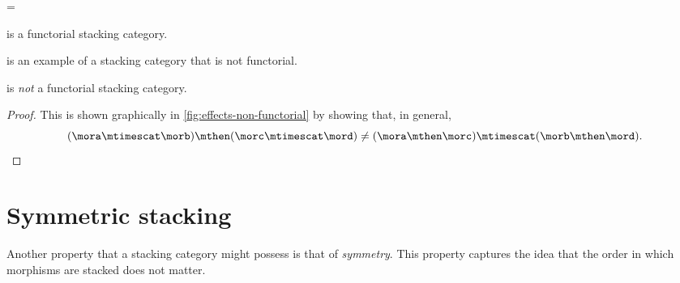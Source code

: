 \begin{figure*}[h]
    \centering
    =
    \caption{Commutation of stacking and composition in a functorial stacking semicategory. }
    \label{fig:stacking-functorial}
\end{figure*}

\begin{lemma}
    \SetL is a functorial stacking category.
\end{lemma}

\Effects is an example of a stacking category that is not functorial.

\begin{lemma}
    \Effects is \emph{not} a functorial stacking category.
\end{lemma}

\begin{proof}
    This is shown graphically in \cref{fig:effects-non-functorial} by showing that, in general,
    \begin{equation}
        (\mora \mtimescat \morb )
        \mthen (\morc \mtimescat \mord )
        \neq
        (\mora \mthen \morc ) \mtimescat (\morb \mthen \mord ).
    \end{equation}
\end{proof}

\begin{figure*}[b]
    \centering
    \caption{Proof that \Effects is not a functorial stacking category by showing that
        the two morphisms above have different representations in \SetL.}
    \label{fig:effects-non-functorial}
\end{figure*}

\section{Symmetric stacking}

Another property that a stacking category might possess is that of \emph{symmetry}.
This property captures the idea that the order in which morphisms are stacked does not matter.

